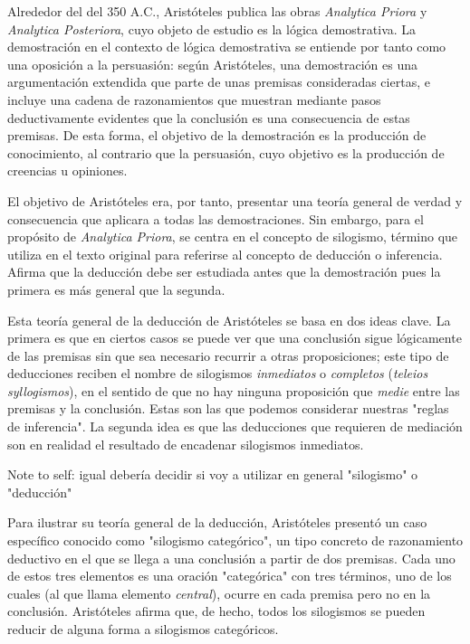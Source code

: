 \documentclass{article}
\begin{document}
Alrededor del del 350 A.C., Aristóteles publica las obras \textit{Analytica Priora} y \textit{Analytica Posteriora}, cuyo objeto de estudio es la lógica demostrativa\cite{smith1989prior}. La demostración en el contexto de lógica demostrativa se entiende por tanto como una oposición a la persuasión: según Aristóteles, una demostración es una argumentación extendida que parte de unas premisas consideradas ciertas, e incluye una cadena de razonamientos que muestran mediante pasos deductivamente evidentes que la conclusión es una consecuencia de estas premisas. De esta forma, el objetivo de la demostración es la producción de conocimiento, al contrario que la persuasión, cuyo objetivo es la producción de creencias u opiniones\cite{corcoran2009aristotle}.

El objetivo de Aristóteles era, por tanto, presentar una teoría general de verdad y consecuencia que aplicara a todas las demostraciones. Sin embargo, para el propósito de \textit{Analytica Priora}, se centra en el concepto de silogismo, término que utiliza en el texto original para referirse al concepto de deducción o inferencia\cite{ross1964aristotle}. Afirma que la deducción debe ser estudiada antes que la demostración pues la primera es más general que la segunda\cite{smith1989prior}.

Esta teoría general de la deducción de Aristóteles se basa en dos ideas clave. La primera es que en ciertos casos se puede ver que una conclusión sigue lógicamente de las premisas sin que sea necesario recurrir a otras proposiciones; este tipo de deducciones reciben el nombre de silogismos \textit{inmediatos} o \textit{completos} (\textit{teleios syllogismos}), en el sentido de que no hay ninguna proposición que \textit{medie} entre las premisas y la conclusión. Estas son las que podemos considerar nuestras "reglas de inferencia". La segunda idea es que las deducciones que requieren de mediación son en realidad el resultado de encadenar silogismos inmediatos\cite{corcoran2009aristotle}.

Note to self: igual debería decidir si voy a utilizar en general "silogismo" o "deducción"

Para ilustrar su teoría general de la deducción, Aristóteles presentó un caso específico conocido como "silogismo categórico"\cite{corcoran2009aristotle}, un tipo concreto de razonamiento deductivo en el que se llega a una conclusión a partir de dos premisas. Cada uno de estos tres elementos es una oración "categórica" con tres términos, uno de los cuales (al que llama elemento \textit{central}), ocurre en cada premisa pero no en la conclusión. Aristóteles afirma que, de hecho, todos los silogismos se pueden reducir de alguna forma a silogismos categóricos\cite{smith1989prior}.
\end{document}
